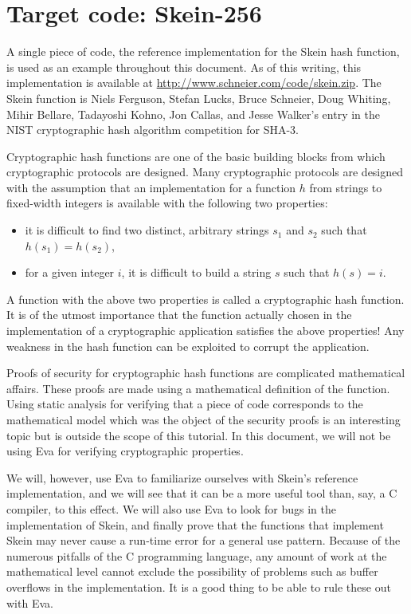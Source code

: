 \documentclass[web]{frama-c-book}
\newcommand{\Eva}{\textsf{Eva}}
\begin{document}
\section{Target code: Skein-256}

A single piece of code, the reference implementation for the Skein
hash function, is used as an example throughout this document. As of
this writing, this implementation is available at
\url{http://www.schneier.com/code/skein.zip}. The Skein function is
Niels Ferguson, Stefan Lucks, Bruce Schneier, Doug Whiting, Mihir
Bellare, Tadayoshi Kohno, Jon Callas, and Jesse Walker's entry in the
NIST cryptographic hash algorithm competition for SHA-3.

Cryptographic hash functions are one of the basic building blocks from
which cryptographic protocols are designed. Many cryptographic
protocols are designed with the assumption that an implementation for
a function $h$ from strings to fixed-width integers is available with
the following two properties:
\begin{itemize}
\item it is difficult to find two distinct, arbitrary strings $s_1$ and $s_2$
such that $h(s_1)=h(s_2)$,
\item for a given integer $i$, it is difficult to build a string $s$
such that $h(s)=i$.
\end{itemize}
A function with the above two properties is called a cryptographic hash
function. It is of the utmost importance that the function actually
chosen in the implementation of a cryptographic application satisfies the
above properties! Any weakness in the hash function can be
exploited to corrupt the application.

Proofs of security for
cryptographic hash functions are complicated mathematical affairs.
These proofs are made using a mathematical definition
of the function. Using static analysis for verifying that a piece
of code corresponds to the mathematical model
which was the object of the security proofs is an interesting
topic but is outside the scope of this tutorial. 
In this document, we will not  be using \Eva{} for
verifying cryptographic properties.

We will, however, use \Eva{} to familiarize ourselves
with Skein's reference implementation, and we will see that
it can be a more useful tool than, say, a C
compiler, to this effect. We will also use \Eva{} to look
for bugs in the implementation of Skein, and finally prove that the
functions that implement Skein may never cause a run-time error for a
general use pattern. Because of the numerous pitfalls of the C
programming language, any amount of work at the 
mathematical level cannot exclude the possibility of problems
such as buffer overflows in the implementation.
It is a good thing to be able to rule these out with \Eva{}.
\end{document}

